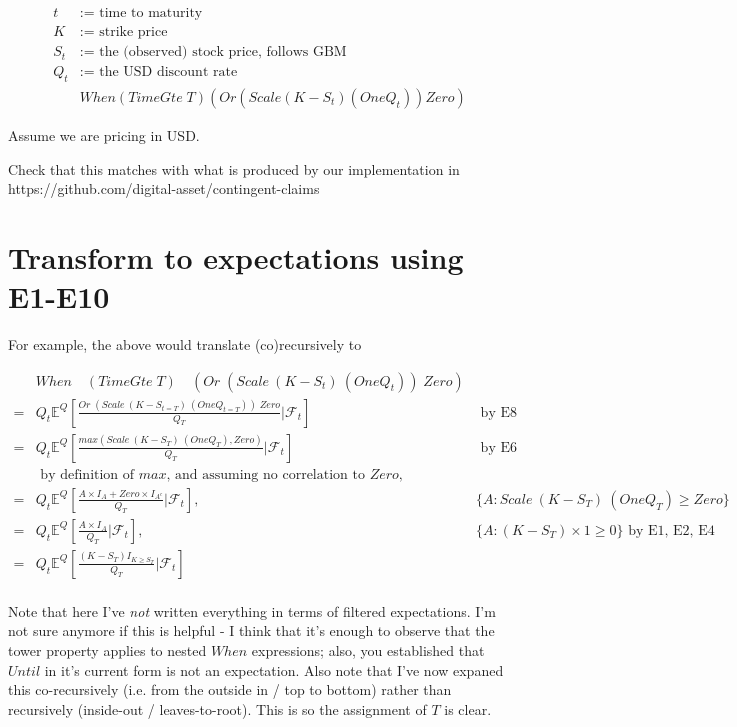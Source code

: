 \documentclass[a4paper]{article}
\begin{document}
\begin{align*}
  t &:= \text{ time to maturity} \\
  K &:= \text{ strike price} \\
  S_t &:= \text{ the (observed) stock price, follows GBM} \\
  Q_t & := \text{ the USD discount rate } \\
  & When (TimeGte \; T) (Or (Scale (K - S_t) (One Q_t)) Zero)
\end{align*}


Assume we are pricing in USD.

Check that this matches with what is produced by our implementation in https://github.com/digital-asset/contingent-claims

\section{Transform to expectations using E1-E10}

For example, the above would translate (co)recursively to

\begin{align*}
& When \quad (TimeGte \; T) \quad (Or \; (Scale \: (K - S_t) \: (One Q_t)) \; Zero) \\
= & Q_t \mathbb{E}^Q[ \frac{ Or \; (Scale \: (K - S_{t = T}) \: (One Q_{t = T})) \; Zero } { Q_T } | \mathcal{F}_t ] & \text{ by E8} \\
= & Q_t \mathbb{E}^Q[ \frac{ max ( Scale \: (K - S_T) \: (One Q_T) , Zero ) } { Q_T } | \mathcal{F}_t ] & \text{ by E6} \\
& \text{ by definition of $max$, and assuming no correlation to $Zero$, } \\
= & Q_t \mathbb{E}^Q[ \frac{  A \times I_A  + Zero \times I_{A^c}} { Q_T } | \mathcal{F}_t ] , & \{ A : Scale \: (K - S_T) \: (One Q_T) \geq Zero \} \\
= & Q_t \mathbb{E}^Q[ \frac{  A \times I_A } { Q_T } | \mathcal{F}_t ] , & \{ A : (K - S_T) \times 1 \geq 0 \} \text{ by E1, E2, E4} \\
= & Q_t \mathbb{E}^Q[ \frac{  (K - S_T) I_{K \geq S_T} } { Q_T } | \mathcal{F}_t ] \\
\end{align*}

Note that here I've \emph{not} written everything in terms of filtered expectations. I'm not sure anymore if this is helpful - I think that it's enough to observe that the tower property applies to nested $When$ expressions; also, you established that $Until$ in it's current form is not an expectation. Also note that I've now expaned this co-recursively (i.e. from the outside in / top to bottom) rather than recursively (inside-out / leaves-to-root). This is so the assignment of $T$ is clear.
\end{document}
